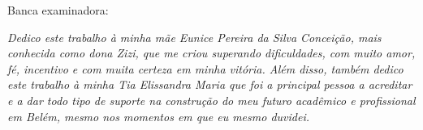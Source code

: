 \documentclass[
	12pt,				%
	openright,			%
	oneside,			%
	a4paper,			%
	english,			%
	brazil				%
	]{abntex2}
\begin{document}
%
% 
%
\begin{folhadeaprovacao}

  \begin{center}
    {\ABNTEXchapterfont\large\imprimirautor}

    \vspace*{\fill}\vspace*{\fill}
    \begin{center}
      \ABNTEXchapterfont\bfseries\Large\imprimirtitulo
    \end{center}
    \vspace*{\fill}
    
    \hspace{.45\textwidth}
    \begin{minipage}{.5\textwidth}
        \imprimirpreambulo
    \end{minipage}%
    \vspace*{\fill}
   \end{center}
        

   Banca examinadora: 
  
      
   \begin{center}
    \vspace*{0.5cm}
    {\large\imprimirlocal}
    \par
    {\large\imprimirdata}
    \vspace*{1cm}
  \end{center}
  
\end{folhadeaprovacao}

\begin{dedicatoria}
   \vspace*{\fill}
   \centering
   \noindent
   \textit{ Dedico este trabalho à minha mãe Eunice Pereira da Silva Conceição, mais conhecida como dona Zizi, que me criou superando dificuldades, com muito amor, fé, incentivo e com muita certeza em minha vitória. Além disso, também dedico este trabalho à minha Tia Elissandra Maria que foi a principal pessoa a acreditar e a dar todo tipo de suporte na construção do meu futuro acadêmico e profissional em Belém, mesmo nos momentos em que eu mesmo duvidei. } \vspace*{\fill}
\end{dedicatoria}
\end{document}
